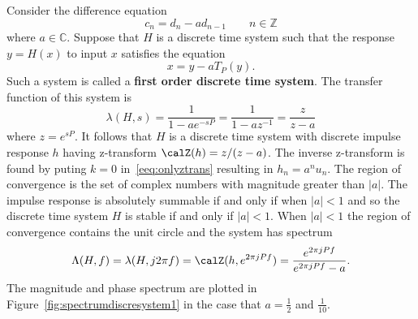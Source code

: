 \documentclass[11pt,a4paper]{book}
\theoremstyle{plain}
\numberwithin{equation}{section}
\newcommand{\ints}{{\mathbb Z}}
\newcommand{\complex}{{\mathbb C}}
\newcommand{\term}{\textbf}
\newcommand{\abs}[1]{\left\vert #1 \right\vert}
\begin{document}
Consider the difference equation
\[
c_n = d_n - a d_{n-1} \qquad n \in \ints
\]
where $a \in \complex$.  Suppose that $H$ is a discrete time system such that the response $y = H(x)$ to input $x$ satisfies the equation
\[
x = y - a T_{P}(y).
\]
Such a system is called a \term{first order discrete time system}.  The transfer function of this system is
\[
\lambda(H,s) = \frac{1}{1 - a e^{-sP}} = \frac{1}{1 - a z^{-1}} = \frac{z}{z - a}
\]
where $z = e^{sP}$.  It follows that $H$ is a discrete time system with discrete impulse response $h$ having z-transform $\calZ(h) = z/(z-a)$.  The inverse z-transform is found by puting $k=0$ in~\eqref{eeq:onlyztrans} resulting in $h_n = a^n u_n$.  The region of convergence is the set of complex numbers with magnitude greater than $\abs{a}$.  The impulse response is absolutely summable if and only if when $\abs{a}< 1$ and so the discrete time system $H$ is stable if and only if $\abs{a} < 1$.  When $\abs{a} < 1$ the region of convergence contains the unit circle and the system has spectrum
\[
\Lambda(H,f) = \lambda(H,j2\pi f) = \calZ(h, e^{2\pi j P f}) = \frac{e^{2\pi j P f}}{e^{2\pi j P f} - a}.
\]
The magnitude and phase spectrum are plotted in Figure~\ref{fig:spectrumdiscresystem1} in the case that $a = \tfrac{1}{2}$ and $\tfrac{1}{10}$.
\end{document}
